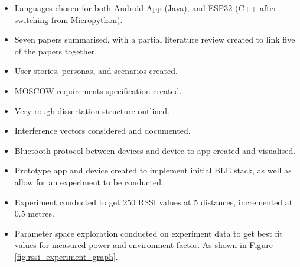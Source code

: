 \documentclass[11pt]{article}
\begin{document}
\begin{itemize}
    \setlength\itemsep{0.1em}
\item Languages chosen for both Android App (Java), and ESP32 (C++ after switching
from Micropython).
\item Seven papers summarised, with a partial literature review created to link 
five of the papers together.
\item User stories, personas, and scenarios created.
\item  MOSCOW requirements specification created.
\item  Very rough dissertation structure outlined.
\item  Interference vectors considered and documented.
\item  Bluetooth protocol between devices and device to app created and visualised.
\item  Prototype app and device created to implement initial BLE stack, as well
as allow for an experiment to be conducted.
\item  Experiment conducted to get 250 RSSI values at 5 distances, incremented at 
0.5 metres.
\item  Parameter space exploration conducted on experiment data to get best fit 
values for measured power and environment factor. As shown in Figure \ref{fig:rssi_experiment_graph}.

\end{itemize}
\end{document}
